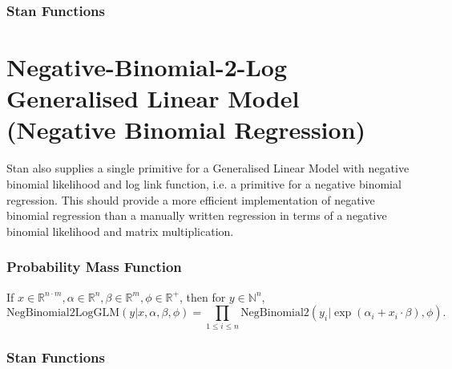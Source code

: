 \begin{description}


\subsubsection{Stan Functions}


\begin{description}       \end{description}


\section{Negative-Binomial-2-Log Generalised Linear Model (Negative Binomial Regression)}\label{neg-binom-2-log-glm.section}


Stan also supplies a single primitive for a Generalised Linear Model with negative binomial likelihood and log link function, i.e. a primitive for a negative binomial regression. This should provide a more efficient implementation of negative binomial regression than a manually written regression in terms of a negative binomial likelihood and matrix multiplication.


\subsubsection{Probability Mass Function}


If $x\in \mathbb{R}^{n\cdot m}, \alpha \in \mathbb{R}^n, \beta\in \mathbb{R}^m, \phi\in \mathbb{R}^+$, then for $y \in \mathbb{N}^n$, \[ \text{NegBinomial2LogGLM}(y|x, \alpha, \beta, \phi) = \prod_{1\leq i \leq n}\text{NegBinomial2}(y_i|\exp(\alpha_i + x_i\cdot \beta), \phi). \] 



\subsubsection{Stan Functions}



\end{description}
